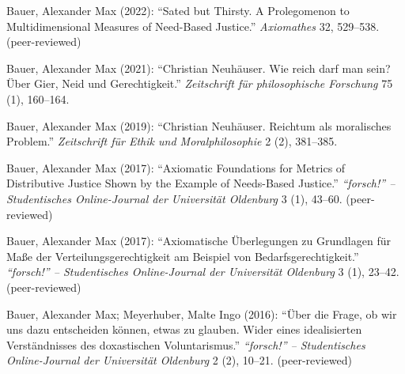 \documentclass[a4paper,10pt]{article}
\newenvironment{literature}{%
   \parskip6pt\parindent0pt\raggedright
   \def\lititem{\hangindent=1cm\hangafter1}}{%
   \par\ignorespaces}
\begin{document}
\begin{literature}
\lititem Bauer, Alexander Max (2022): \enquote{Sated but Thirsty. A Prolegomenon to Multidimensional Measures of Need-Based Justice.} \textit{Axiomathes} 32, 529--538. (peer-reviewed)

\lititem Bauer, Alexander Max (2021): \enquote{Christian Neuhäuser. Wie reich darf man sein? Über Gier, Neid und Gerechtigkeit.} \textit{Zeitschrift für philosophische Forschung} 75 (1), 160--164.

\lititem Bauer, Alexander Max (2019): \enquote{Christian Neuhäuser. Reichtum als moralisches Problem.} \textit{Zeitschrift für Ethik und Moralphilosophie} 2 (2), 381--385.

\lititem Bauer, Alexander Max (2017): \enquote{Axiomatic Foundations for Metrics of Distributive Justice Shown by the Example of Needs-Based Justice.} \textit{\enquote{forsch!} -- Studentisches Online-Journal der Universität Oldenburg} 3 (1), 43--60. (peer-reviewed)

\lititem Bauer, Alexander Max (2017): \enquote{Axiomatische Überlegungen zu Grundlagen für Maße der Verteilungsgerechtigkeit am Beispiel von Bedarfsgerechtigkeit.} \textit{\enquote{forsch!} -- Studentisches Online-Journal der Universität Oldenburg} 3 (1), 23--42. (peer-reviewed)

\lititem Bauer, Alexander Max; Meyerhuber, Malte Ingo (2016): \enquote{Über die Frage, ob wir uns dazu entscheiden können, etwas zu glauben. Wider eines idealisierten Verständnisses des doxastischen Voluntarismus.} \textit{\enquote{forsch!} -- Studentisches Online-Journal der Universität Oldenburg} 2 (2), 10--21. (peer-reviewed)
\end{literature}
\end{document}
